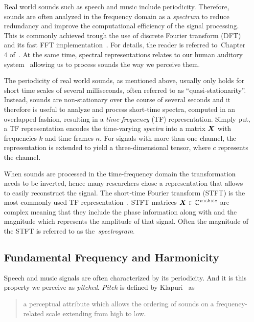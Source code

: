 Real world sounds such as speech and music include periodicity.
Therefore, sounds are often analyzed in the frequency domain as a \emph{spectrum} to reduce redundancy and improve the computational efficiency of the signal processing.
This is commonly achieved trough the use of discrete Fourier transform (DFT) and its fast FFT implementation~\cite{cooley65}. 
For details, the reader is referred to~Chapter 4 of~\cite{proakis96}.
At the same time, spectral representations relates to our human auditory system~\cite{zwicker13, moore89, bregman90} allowing us to process sounds the way we perceive them.
\par
The periodicity of real world sounds, as mentioned above, usually only holds for short time scales of several milliseconds, often referred to as ``quasi-stationarity''.
Instead, sounds are non-stationary over the course of several seconds and it therefore is useful to analyze and process short-time spectra, computed in an overlapped fashion, resulting in a \emph{time-frequency} (TF) representation.
Simply put, a TF representation encodes the time-varying \textit{spectra} into a matrix \({\bm{X}}\) with frequencies \(k\) and time frames \(n\).
For signals with more than one channel, the representation is extended to yield a three-dimensional tensor, where \(c\) represents the channel.
\par
When sounds are processed in the time-frequency domain the transformation needs to be inverted, hence many researchers chose a representation that allows to easily reconstruct the signal.
The short-time Fourier transform (STFT) is the most commonly used TF representation~\cite{mcaulay86}.
STFT matrices \({\bm{X}} \in {\mathbb{C}}^{n \times k \times c}\) are complex meaning that they include the phase information along with and the magnitude which represents the amplitude of that signal.
Often the magnitude of the STFT is referred to as the~\emph{spectrogram}.

\subsection{Fundamental Frequency and Harmonicity}

Speech and music signals are often characterized by its periodicity.
And it is this property we perceive as \emph{pitched}.
\emph{Pitch} is defined by Klapuri~\cite{klapuri06book} as 

\begin{quote}
a perceptual attribute which allows the ordering of sounds on a frequency-related scale extending from high to low.
\end{quote}

